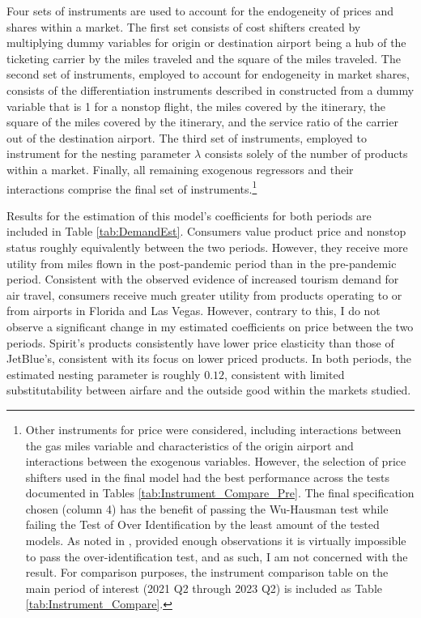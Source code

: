 \documentclass{article}
\begin{document}
	 Four sets of instruments are used to account for the endogeneity of prices and shares within a market. The first set consists of cost shifters created by multiplying dummy variables for origin or destination airport being a hub of the ticketing carrier by the miles traveled and the square of the miles traveled. The second set of instruments, employed to account for endogeneity in market shares, consists of the differentiation instruments described in \citet{gandhi_measuring_2019} constructed from a dummy variable that is 1 for a nonstop flight, the miles covered by the itinerary, the square of the miles covered by the itinerary, and the service ratio of the carrier out of the destination airport. The third set of instruments, employed to instrument for the nesting parameter $\lambda$ consists solely of the number of products within a market. Finally, all remaining exogenous regressors and their interactions comprise the final set of instruments.\footnote{Other instruments for price were considered, including interactions between the gas miles variable and characteristics of the origin airport and interactions between the exogenous variables. However, the selection of price shifters used in the final model had the best performance across the tests documented in Tables \ref{tab:Instrument_Compare_Pre}. The final specification chosen (column 4) has the benefit of passing the Wu-Hausman test while failing the Test of Over Identification by the least amount of the tested models. As noted in \citet{nevo_measuring_2001}, provided enough observations it is virtually impossible to pass the over-identification test, and as such, I am not concerned with the result. For comparison purposes, the instrument comparison table on the main period of interest (2021 Q2 through 2023 Q2) is included as Table \ref{tab:Instrument_Compare}.}
	
    Results for the estimation of this model's coefficients for both periods are included in Table \ref{tab:DemandEst}. Consumers value product price and nonstop status roughly equivalently between the two periods. However, they receive more utility from miles flown in the post-pandemic period than in the pre-pandemic period. Consistent with the observed evidence of increased tourism demand for air travel, consumers receive much greater utility from products operating to or from airports in Florida and Las Vegas. However, contrary to this, I do not observe a significant change in my estimated coefficients on price between the two periods. Spirit's products consistently have lower price elasticity than those of JetBlue's, consistent with its focus on lower priced products. In both periods, the estimated nesting parameter is roughly $0.12$, consistent with limited substitutability between airfare and the outside good within the markets studied.
\end{document}
